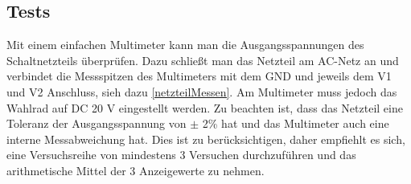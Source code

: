\subsection{Tests}
Mit einem einfachen Multimeter kann man die Ausgangsspannungen des Schaltnetzteils überprüfen. Dazu schließt man das Netzteil am AC-Netz an und verbindet die Messspitzen des Multimeters mit dem GND und jeweils dem V1 und V2 Anschluss, sieh dazu \ref{netzteilMessen}. Am Multimeter muss jedoch das Wahlrad auf DC 20 V eingestellt werden. Zu beachten ist, dass das Netzteil eine Toleranz der Ausgangsspannung von $\pm$ 2\% hat und das Multimeter auch eine interne Messabweichung hat. Dies ist zu berücksichtigen, daher empfiehlt es sich, eine Versuchsreihe von mindestens 3 Versuchen  durchzuführen und das arithmetische Mittel der 3 Anzeigewerte zu nehmen.

